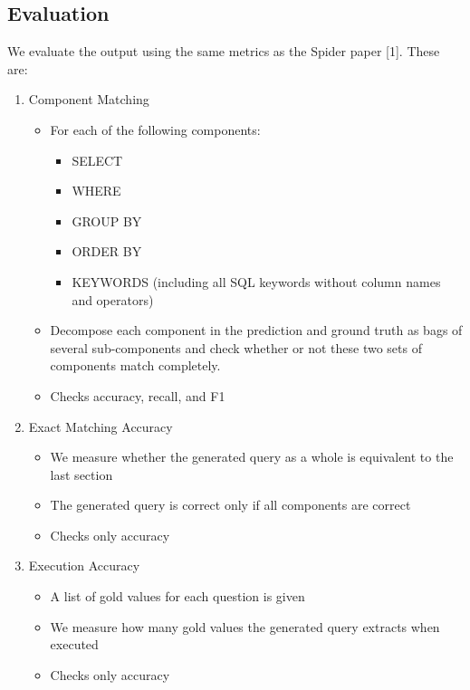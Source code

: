 \subsection{Evaluation}
\label{sec:evaluation-metrics}

We evaluate the output using the same metrics as the Spider paper [1]. These are:

\begin{enumerate}
\item Component Matching
    \begin{itemize}
        \item For each of the following components:
        \begin{itemize}
            \item SELECT
            \item WHERE
            \item GROUP BY
            \item ORDER BY
            \item KEYWORDS (including all SQL keywords without column names and operators)
        \end{itemize}
        \item Decompose each component in the prediction and ground truth as bags of several sub-components and check whether or not these two sets of components match completely.
        \item Checks accuracy, recall, and F1
    \end{itemize}
\item Exact Matching Accuracy
    \begin{itemize}
        \item We measure whether the generated query as a whole is equivalent to the last section
        \item The generated query is correct only if all components are correct
        \item Checks only accuracy
    \end{itemize}
\item Execution Accuracy
    \begin{itemize}
        \item A list of gold values for each question is given
        \item We measure how many gold values the generated query extracts when executed
        \item Checks only accuracy
    \end{itemize}
\end{enumerate}

